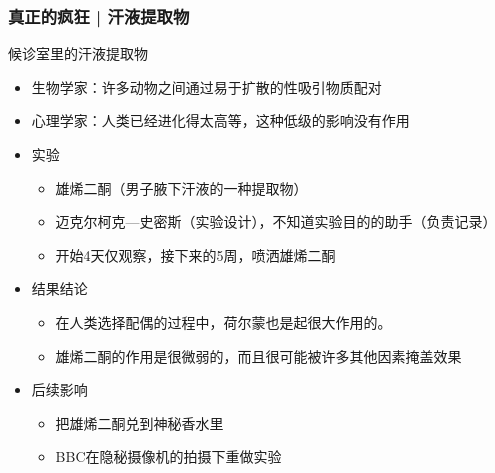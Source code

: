 \begin{frame}
  \frametitle{真正的疯狂 | 汗液提取物}
  \begin{block}{候诊室里的汗液提取物}
    \begin{itemize}
      \item 生物学家：许多动物之间通过易于扩散的性吸引物质配对
      \item 心理学家：人类已经进化得太高等，这种低级的影响没有作用
    \pause
      \item 实验
        \begin{itemize}
          \item 雄烯二酮（男子腋下汗液的一种提取物）
          \item 迈克尔\textbullet 柯克—史密斯（实验设计），不知道实验目的的助手（负责记录）
          \item 开始4天仅观察，接下来的5周，喷洒雄烯二酮
        \end{itemize}
      \item 结果结论
        \begin{itemize}
          \item 在人类选择配偶的过程中，荷尔蒙也是起很大作用的。
          \item 雄烯二酮的作用是很微弱的，而且很可能被许多其他因素掩盖效果
        \end{itemize}
      \item 后续影响
        \begin{itemize}
          \item 把雄烯二酮兑到神秘香水里
          \item BBC在隐秘摄像机的拍摄下重做实验
        \end{itemize}
    \end{itemize}
  \end{block}
\end{frame}

